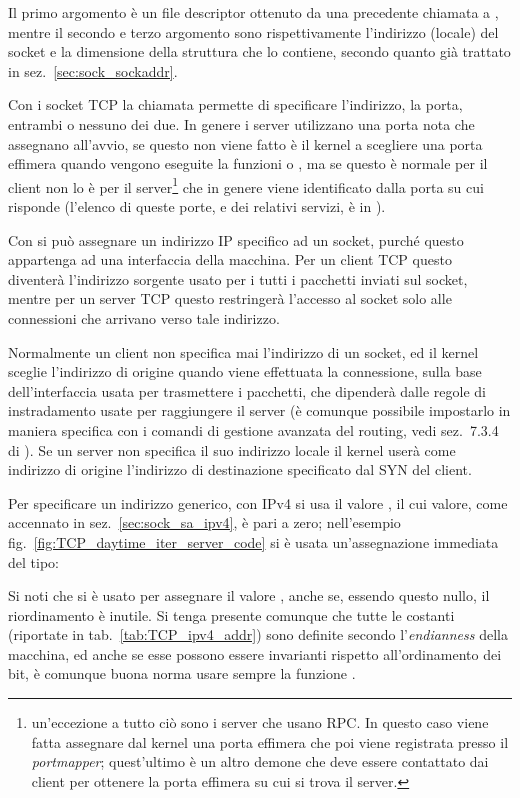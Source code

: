 Il primo argomento è un file descriptor ottenuto da una precedente chiamata a
, mentre il secondo e terzo argomento sono rispettivamente
l'indirizzo (locale) del socket e la dimensione della struttura che lo
contiene, secondo quanto già trattato in sez.~\ref{sec:sock_sockaddr}. 

Con i socket TCP la chiamata  permette di specificare l'indirizzo,
la porta, entrambi o nessuno dei due. In genere i server utilizzano una porta
nota che assegnano all'avvio, se questo non viene fatto è il kernel a
scegliere una porta effimera quando vengono eseguite la funzioni
 o , ma se questo è normale per il client non lo è
per il server\footnote{un'eccezione a tutto ciò sono i server che usano RPC.
  In questo caso viene fatta assegnare dal kernel una porta effimera che poi
  viene registrata presso il \textit{portmapper}; quest'ultimo è un altro
  demone che deve essere contattato dai client per ottenere la porta effimera
  su cui si trova il server.} che in genere viene identificato dalla porta su
cui risponde (l'elenco di queste porte, e dei relativi servizi, è in
).

Con  si può assegnare un indirizzo IP specifico ad un socket,
purché questo appartenga ad una interfaccia della macchina. Per un client TCP
questo diventerà l'indirizzo sorgente usato per i tutti i pacchetti inviati
sul socket, mentre per un server TCP questo restringerà l'accesso al socket
solo alle connessioni che arrivano verso tale indirizzo.

Normalmente un client non specifica mai l'indirizzo di un socket, ed il kernel
sceglie l'indirizzo di origine quando viene effettuata la connessione, sulla
base dell'interfaccia usata per trasmettere i pacchetti, che dipenderà dalle
regole di instradamento usate per raggiungere il server (è comunque possibile
impostarlo in maniera specifica con i comandi di gestione avanzata del
routing, vedi sez.~7.3.4 di \cite{AGL}). Se un server non specifica il suo
indirizzo locale il kernel userà come indirizzo di origine l'indirizzo di
destinazione specificato dal SYN del client.

Per specificare un indirizzo generico, con IPv4 si usa il valore
, il cui valore, come accennato in
sez.~\ref{sec:sock_sa_ipv4}, è pari a zero; nell'esempio
fig.~\ref{fig:TCP_daytime_iter_server_code} si è usata un'assegnazione
immediata del tipo: 

Si noti che si è usato  per assegnare il valore
, anche se, essendo questo nullo, il riordinamento è
inutile.  Si tenga presente comunque che tutte le costanti 
(riportate in tab.~\ref{tab:TCP_ipv4_addr}) sono definite secondo
l'\textit{endianness} della macchina, ed anche se esse possono essere
invarianti rispetto all'ordinamento dei bit, è comunque buona norma usare
sempre la funzione .

